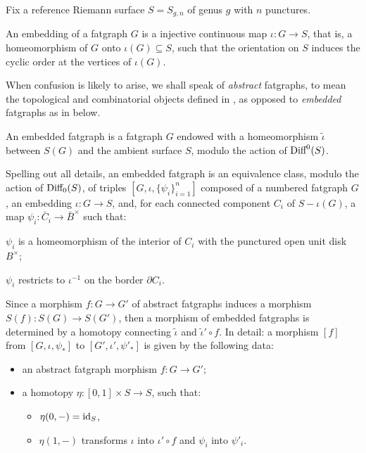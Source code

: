 Fix a reference Riemann surface $S = S_{g,n}$ of genus $g$ with $n$
punctures.

An embedding of a fatgraph $G$ is a injective continuous map $\iota:G\to
S$, that is, a homeomorphism of $G$ onto $\iota(G) \subseteq S$, such that the
orientation on $S$ induces the cyclic order at the vertices of $\iota(G)$.

When confusion is likely to arise, we shall speak of \emph{abstract}
fatgraphs, to mean the topological and combinatorial objects
defined in , as opposed to \emph{embedded}
fatgraphs as in  below.

\begin{definition}\label{dfn:embedded-rg}
  An embedded fatgraph is a fatgraph $G$ endowed with a
  homeomorphism ${\tilde \iota}$ between $S(G)$ and the ambient
  surface $S$, modulo the action of $\textrm{Diff}^0(S)$.
\end{definition}
Spelling out all details, an embedded fatgraph is an equivalence
class, modulo the action of $\textrm{Diff}_0(S)$, of triples $[G, \iota,
\{\psi_i\}_{i=1}^n]$ composed of a numbered fatgraph $G$, an
embedding $\iota:G\to S$, and, for each connected component $C_i$ of
$S - \iota(G)$, a map $\psi_i: {\bar C_i} \to {\bar B}^\times$ such
that:
\begin{inparaenum}[\sl (1)]
\item $\psi_i$ is a homeomorphism of the interior of $C_i$ with the
  punctured open unit disk $B^\times$;
\item $\psi_i$ restricts to $\iota^{-1}$ on the border $\partial C_i$.
\end{inparaenum}

Since a morphism $f:G\to G'$ of abstract fatgraphs induces a morphism
$S(f):S(G)\to S(G')$, then a morphism of embedded fatgraphs is
determined by a homotopy connecting ${\tilde \iota}$ and ${\tilde
  \iota' \circ f}$.  In detail: a morphism $[f]$ from $[G, \iota,
\psi_*]$ to $[G', \iota', \psi'_*]$ is given by the following data:
\begin{itemize}
\item an abstract fatgraph morphism $f:G\to G'$;
\item a homotopy $\eta:[0,1] \times S\to S$, such that:
  \begin{itemize}
  \item $\eta(0,-) = \operatorname{id}_S$,
  \item $\eta(1,-)$ transforms $\iota$ into $\iota' \circ f$
    and $\psi_i$ into $\psi'_i$.
  \end{itemize}

\end{itemize}

